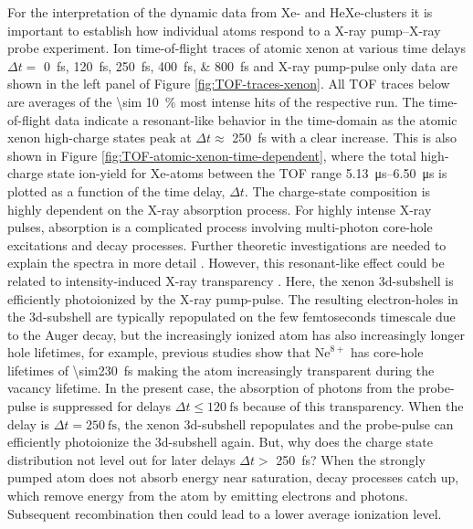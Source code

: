 For the interpretation of the dynamic data from Xe- and HeXe-clusters it is important to establish how individual atoms respond to a X-ray pump--X-ray probe experiment. Ion time-of-flight traces of atomic xenon at various time delays $\Delta t =$ \SIlist{0;120;250;400;800}{\femto\second} and X-ray pump-pulse only data are shown in the left panel of Figure \ref{fig:TOF-traces-xenon}. All TOF traces below are averages of the \SI{\sim 10}{\percent} most intense hits of the respective run. The time-of-flight data indicate a resonant-like behavior in the time-domain as the atomic xenon high-charge states peak at $\Delta t\approx$ \SI{250}{\femto\second} with a clear increase. This is also shown in Figure \ref{fig:TOF-atomic-xenon-time-dependent}, where the total high-charge state ion-yield for Xe-atoms between the TOF range \SIrange{5.13}{6.50}{\micro\second} is plotted as a function of the time delay, $\Delta t$. The charge-state composition is highly dependent on the X-ray absorption process. For highly intense X-ray pulses, absorption is a complicated process involving multi-photon core-hole excitations and decay processes. Further theoretic investigations are needed to explain the spectra in more detail \cite{Ho-2014-PRL,Ho-2016-PC}. However, this resonant-like effect could be related to intensity-induced X-ray transparency \citep{Young-2010-Nature,Schorb-2012-PRL}. Here, the xenon 3d-subshell is efficiently photoionized by the X-ray pump-pulse. The resulting electron-holes in the 3d-subshell are typically repopulated on the few femtoseconds timescale due to the Auger decay, but the increasingly ionized atom has also increasingly longer hole lifetimes, for example, previous studies show that $\text{Ne}^{8+}$ has core-hole lifetimes of \SI{\sim230}{\femto\second} \cite{Young-2010-Nature} making the atom increasingly transparent during the vacancy lifetime. In the present case, the absorption of photons from the probe-pulse is suppressed for delays $\Delta t \leq \SI{120}{\femto\second}$ because of this transparency. When the delay is $\Delta t = \SI{250}{\femto\second}$, the xenon 3d-subshell repopulates and the probe-pulse can efficiently photoionize the 3d-subshell again. But, why does the charge state distribution not level out for later delays $\Delta t >$ \SI{250}{\femto\second}? When the strongly pumped atom does not absorb energy near saturation, decay processes catch up, which remove energy from the atom by emitting electrons and photons. Subsequent recombination then could lead to a lower average ionization level.\\[1\baselineskip]
